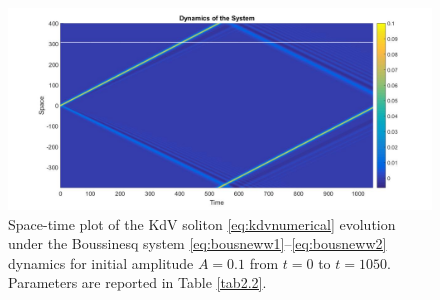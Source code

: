 \documentclass[alpha-refs, 12pt]{wiley-article}
\begin{document}
\begin{figure}
  \centering
  \includegraphics[width=0.95\linewidth]{figs/numerique_bouss.jpg}
  \caption{Space-time plot of the KdV soliton \eqref{eq:kdvnumerical} evolution under the Boussinesq system \eqref{eq:bousneww1}--\eqref{eq:bousneww2} dynamics for initial amplitude $A = 0.1$ from $t = 0$ to $t = 1050$. Parameters are reported in Table \ref{tab2.2}.}
  \label{fig:3.6}
\end{figure}
\end{document}
